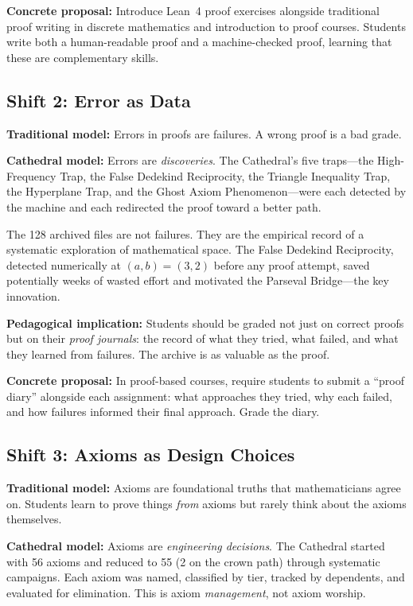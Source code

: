 \documentclass[11pt,a4paper]{article}
\begin{document}
\textbf{Concrete proposal:} Introduce Lean~4 proof exercises alongside
traditional proof writing in discrete mathematics and introduction
to proof courses. Students write both a human-readable proof and a
machine-checked proof, learning that these are complementary skills.

\subsection{Shift 2: Error as Data}

\textbf{Traditional model:} Errors in proofs are failures. A wrong
proof is a bad grade.

\textbf{Cathedral model:} Errors are \emph{discoveries}. The
Cathedral's five traps---the High-Frequency Trap, the False Dedekind
Reciprocity, the Triangle Inequality Trap, the Hyperplane Trap, and
the Ghost Axiom Phenomenon---were each detected by the machine and
each redirected the proof toward a better path.

The 128 archived files are not failures. They are the empirical record
of a systematic exploration of mathematical space. The False Dedekind
Reciprocity, detected numerically at $(a,b) = (3,2)$ before any proof
attempt, saved potentially weeks of wasted effort and motivated the
Parseval Bridge---the key innovation.

\textbf{Pedagogical implication:} Students should be graded not just
on correct proofs but on their \emph{proof journals}: the record of
what they tried, what failed, and what they learned from failures.
The archive is as valuable as the proof.

\textbf{Concrete proposal:} In proof-based courses, require students
to submit a ``proof diary'' alongside each assignment: what approaches
they tried, why each failed, and how failures informed their
final approach. Grade the diary.

\subsection{Shift 3: Axioms as Design Choices}

\textbf{Traditional model:} Axioms are foundational truths that
mathematicians agree on. Students learn to prove things \emph{from}
axioms but rarely think about the axioms themselves.

\textbf{Cathedral model:} Axioms are \emph{engineering decisions}.
The Cathedral started with 56 axioms and reduced to 55 (2 on the
crown path) through systematic campaigns. Each axiom was named,
classified by tier, tracked by dependents, and evaluated for
elimination. This is axiom \emph{management}, not axiom worship.
\end{document}
